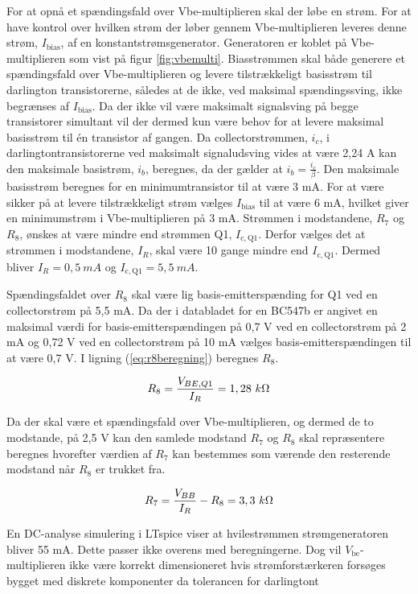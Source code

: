 For at opnå et spændingsfald over Vbe-multiplieren skal der løbe en strøm. For at have kontrol over hvilken strøm der løber gennem Vbe-multiplieren leveres denne strøm,  $I_\mathrm{bias}$, af en konstantstrømsgenerator. Generatoren er koblet på Vbe-multiplieren som vist på figur \ref{fig:vbemulti}. Biasstrømmen skal både generere et spændingsfald over Vbe-multiplieren og levere tilstrækkeligt basisstrøm til darlington transistorerne, således at de ikke, ved maksimal spændingssving, ikke begrænses af $I_\mathrm{bias}$. Da der ikke vil være maksimalt signalsving på begge transistorer simultant vil der dermed kun være behov for at levere maksimal basisstrøm til én transistor af gangen. Da collectorstrømmen, $i_c$, i darlingtontransistorerne ved maksimalt signaludsving vides at være 2,24 A kan den maksimale basistrøm, $i_b$, beregnes, da der gælder at $i_b = \frac{i_c}{\beta}$. Den maksimale basisstrøm beregnes for en minimumtransistor til at være 3 mA. For at være sikker på at levere tilstrækkeligt strøm vælges $I_\mathrm{bias}$ til at være 6 mA, hvilket giver en minimumstrøm i Vbe-multiplieren på 3 mA. Strømmen i modstandene, $R_7$ og $R_8$, ønskes at være mindre end strømmen Q1,  $I_\mathrm{c,Q1}$. Derfor vælges det at strømmen i modstandene,  $I_R$, skal være 10 gange mindre end $I_\mathrm{c,Q1}$. Dermed bliver $I_R = 0,5~mA$ og $I_\mathrm{c,Q1} = 5,5~mA$. 

Spændingsfaldet over $R_8$ skal være lig basis-emitterspænding for Q1 ved en collectorstrøm på 5,5 mA. Da der i databladet for en BC547b er angivet en maksimal værdi for basis-emitterspændingen på 0,7 V ved en collectorstrøm på 2 mA og 0,72 V ved en collectorstrøm på 10 mA vælges basis-emitterspændingen til at være 0,7 V. I ligning (\ref{eq:r8beregning}) beregnes $R_8$.

\begin{equation}
R_8 = \frac{V_{BE,Q1}}{I_R} = 1,28 ~k\ohm
\label{eq:r8beregning}
\end{equation}

Da der skal være et spændingsfald over Vbe-multiplieren, og dermed de to modstande, på 2,5 V kan den samlede modstand $R_7$ og $R_8$ skal repræsentere beregnes hvorefter værdien af $R_7$ kan bestemmes som værende den resterende modstand når $R_8$ er trukket fra.

\begin{equation}
R_7 = \frac{V_{BB}}{I_R} - R_8 = 3,3~k\ohm
\label{eq:r7beregning}
\end{equation}

En DC-analyse simulering i LTspice viser at hvilestrømmen strømgeneratoren bliver 55 mA. Dette passer ikke overens med beregningerne. Dog vil $V_\mathrm{be}$-multiplieren ikke være korrekt dimensioneret hvis strømforstærkeren forsøges bygget med diskrete komponenter da tolerancen for darlingtont

